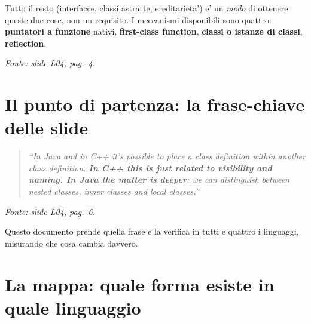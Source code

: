 \documentclass{report}
\newcommand{\fonteslide}[1]{{\footnotesize\itshape\color{gray} Fonte: slide \emph{L04}, pag.~#1.\par}}
\begin{document}
Tutto il resto (interfacce, classi astratte, ereditarieta') e' un
\emph{modo} di ottenere queste due cose, non un requisito. I meccanismi
disponibili sono quattro: \textbf{puntatori a funzione} nativi,
\textbf{first-class function}, \textbf{classi o istanze di classi},
\textbf{reflection}.


\fonteslide{4}

\section{Il punto di partenza: la frase-chiave delle slide}

\begin{quote}\itshape
``In Java and in C++ it's possible to place a class definition within
another class definition. \textbf{In C++ this is just related to
visibility and naming. In Java the matter is deeper}; we can distinguish
between \emph{nested classes}, \emph{inner classes} and \emph{local
classes}.''
\end{quote}

\fonteslide{6}

Questo documento prende quella frase e la verifica in tutti e quattro i
linguaggi, misurando che cosa cambia davvero.

\section{La mappa: quale forma esiste in quale linguaggio}
\end{document}
